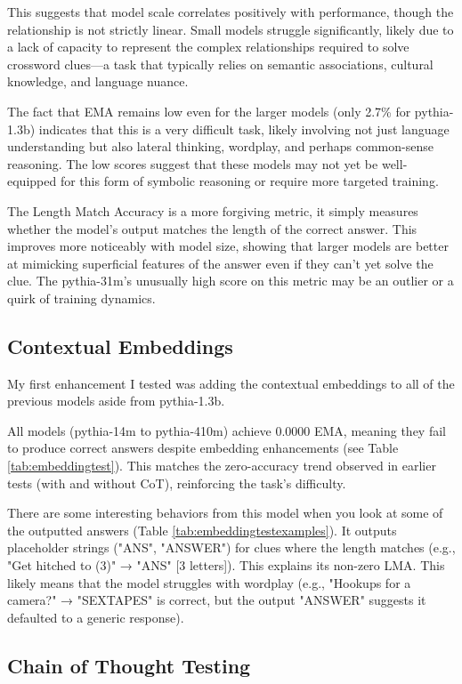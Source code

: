 \documentclass[
	a4paper, %
	10pt, %
	unnumberedsections, %
	twoside, %
]{LTJournalArticle}
\begin{document}
This suggests that model scale correlates positively with performance, though the relationship is not strictly linear. Small models struggle significantly, likely due to a lack of capacity to represent the complex relationships required to solve crossword clues—a task that typically relies on semantic associations, cultural knowledge, and language nuance.

The fact that EMA remains low even for the larger models (only 2.7\% for pythia-1.3b) indicates that this is a very difficult task, likely involving not just language understanding but also lateral thinking, wordplay, and perhaps common-sense reasoning. The low scores suggest that these models may not yet be well-equipped for this form of symbolic reasoning or require more targeted training.

The Length Match Accuracy is a more forgiving metric, it simply measures whether the model's output matches the length of the correct answer. This improves more noticeably with model size, showing that larger models are better at mimicking superficial features of the answer even if they can't yet solve the clue. The pythia-31m’s unusually high score on this metric may be an outlier or a quirk of training dynamics.

\subsection{Contextual Embeddings}

My first enhancement I tested was adding the contextual embeddings to all of the previous models aside from pythia-1.3b.

All models (pythia-14m to pythia-410m) achieve 0.0000 EMA, meaning they fail to produce correct answers despite embedding enhancements (see Table \ref{tab:embeddingtest}). This matches the zero-accuracy trend observed in earlier tests (with and without CoT), reinforcing the task’s difficulty.

There are some interesting behaviors from this model when you look at some of the outputted answers (Table \ref{tab:embeddingtestexamples}). It outputs placeholder strings ("ANS", "ANSWER") for clues where the length matches (e.g., "Get hitched to (3)" → "ANS" [3 letters]). This explains its non-zero LMA. This likely means that the model struggles with wordplay (e.g., "Hookups for a camera?" → "SEXTAPES" is correct, but the output "ANSWER" suggests it defaulted to a generic response).


\subsection{Chain of Thought Testing}
\end{document}
